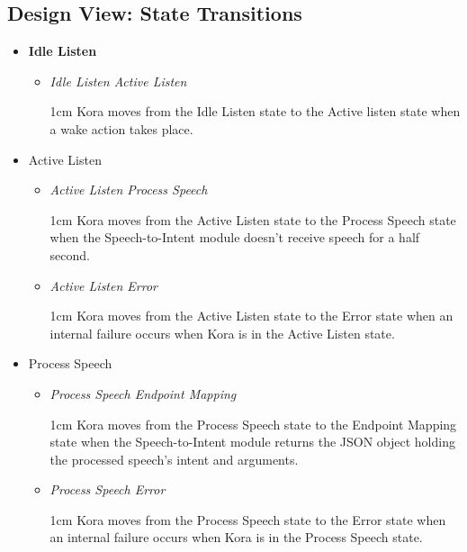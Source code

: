 \documentclass[onecolumn, draftclsnofoot,10pt, compsoc]{IEEEtran}
\newenvironment{indentItem}[1][1cm]{\begin{adjustwidth}{#1}{}}{\end{adjustwidth}}
\begin{document}
	\subsection{Design View: State Transitions}
		\begin{itemize}	
			\item \textbf{Idle Listen}
			\begin{itemize}
				\item \textit{Idle Listen \textrightarrow{}  Active Listen}
				\begin{indentItem}
					Kora moves from the Idle Listen state to the Active listen state when a wake action takes place.
				\end{indentItem}
			\end{itemize}
		
		\item Active Listen
		\begin{itemize}
			\item \textit{Active Listen \textrightarrow{}  Process Speech}
			\begin{indentItem}
				Kora moves from the Active Listen state to the Process Speech state when the Speech-to-Intent module doesn't receive speech for a half second.
			\end{indentItem}
			\item \textit{Active Listen \textrightarrow{}  Error}
			\begin{indentItem}
				Kora moves from the Active Listen state to the Error state when an internal failure occurs when Kora is in the Active Listen state.
			\end{indentItem}
		\end{itemize}
		
		\item Process Speech
		\begin{itemize}
			\item \textit{Process Speech \textrightarrow{} Endpoint Mapping}
			\begin{indentItem}
				Kora moves from the Process Speech state to the Endpoint Mapping state when the Speech-to-Intent module returns the JSON object holding the processed speech's intent and arguments.
			\end{indentItem}
			\item \textit{Process Speech \textrightarrow{} Error}
			\begin{indentItem}
				Kora moves from the Process Speech state to the Error state when an internal failure occurs when Kora is in the Process Speech state.
			\end{indentItem}
		\end{itemize}
		

\end{itemize}
\end{document}
